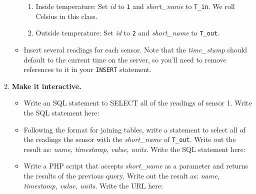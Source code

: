 \documentclass[11pt]{article} %
\begin{document}
\begin{enumerate}
\begin{itemize}
\begin{enumerate}
\item Inside temperature: Set \emph{id} to \verb|1| and \emph{short\_name} to \verb|T_in|. We roll Celsius in this class.
\item Outside temperature: Set \emph{id} to \verb|2| and \emph{short\_name} to \verb|T_out|.
\end{enumerate}
\item Insert several readings for each sensor. Note that the \emph{time\_stamp} should default to the current time on the server, so you'll need to remove references to it in your \verb|INSERT| statement.
\end{itemize}
\item {\bf Make it interactive.}
\begin{itemize}
\item Write an SQL statement to SELECT all of the readings of sensor 1. Write the SQL statement here:
\vspace{0.25in}
\item Following the format for joining tables, write a statement to select all of the readings the sensor with the \emph{short\_name} of \verb|T_out|. Write out the result as: \emph{name, timestamp, value, units}. Write the SQL statement here:
\vspace{0.25in}
\item Write a PHP script that accepts \emph{short\_name} as a parameter and returns the results of the previous query. Write out the result as: \emph{name, timestamp, value, units}. Write the URL here:
\end{itemize}
\end{enumerate}
\end{document}

